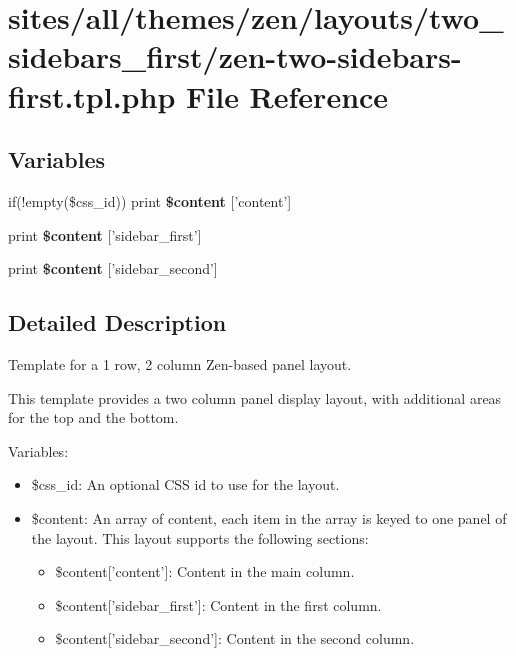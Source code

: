 \hypertarget{zen-two-sidebars-first_8tpl_8php}{
\section{sites/all/themes/zen/layouts/two\_\-sidebars\_\-first/zen-two-sidebars-first.tpl.php File Reference}
\label{zen-two-sidebars-first_8tpl_8php}
}
\subsection*{Variables}
\begin{CompactItemize}
\item 
\hypertarget{zen-two-sidebars-first_8tpl_8php_16767ac2e2b027ec00a0c12535d2ba7a}{
if(!empty(\$css\_\-id)) print \textbf{\$content} \mbox{[}'content'\mbox{]}}
\label{zen-two-sidebars-first_8tpl_8php_16767ac2e2b027ec00a0c12535d2ba7a}

\item 
\hypertarget{zen-two-sidebars-first_8tpl_8php_8fbe76276dfb5a084cc042c32e8e6394}{
print \textbf{\$content} \mbox{[}'sidebar\_\-first'\mbox{]}}
\label{zen-two-sidebars-first_8tpl_8php_8fbe76276dfb5a084cc042c32e8e6394}

\item 
\hypertarget{zen-two-sidebars-first_8tpl_8php_4f8fb8ae436a00e7bdfe8b16bc3f0dd4}{
print \textbf{\$content} \mbox{[}'sidebar\_\-second'\mbox{]}}
\label{zen-two-sidebars-first_8tpl_8php_4f8fb8ae436a00e7bdfe8b16bc3f0dd4}

\end{CompactItemize}


\subsection{Detailed Description}
Template for a 1 row, 2 column Zen-based panel layout.

This template provides a two column panel display layout, with additional areas for the top and the bottom.

Variables:\begin{itemize}
\item \$css\_\-id: An optional CSS id to use for the layout.\item \$content: An array of content, each item in the array is keyed to one panel of the layout. This layout supports the following sections:\begin{itemize}
\item \$content\mbox{[}'content'\mbox{]}: Content in the main column.\item \$content\mbox{[}'sidebar\_\-first'\mbox{]}: Content in the first column.\item \$content\mbox{[}'sidebar\_\-second'\mbox{]}: Content in the second column. \end{itemize}
\end{itemize}
